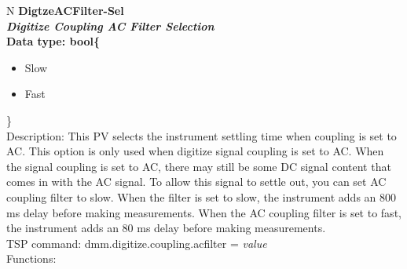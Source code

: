 \documentclass[openany]{article}
\begin{document}
		\begin{tabular}{N}
			\hline
			\bfseries DigtzeACFilter-Sel\label{pv:digtzeacfilter-sel} \\ \hline
			\emph{Digitize Coupling AC Filter Selection} \\
			Data type: bool\{\begin{itemize}[noitemsep]
				\small
				\item[] Slow
				\item[] Fast
			\end{itemize}\} \\
			Description: This PV selects the instrument settling time when coupling is set to AC. This option is only used when digitize signal coupling is set to AC. When the signal coupling is set to AC, there may still be some DC signal content that comes in with the AC signal. To allow this signal to settle out, you can set AC coupling filter to slow. When the filter is set to slow, the instrument adds an 800 ms delay before making measurements. When the AC coupling filter is set to fast, the instrument adds an 80 ms delay before making measurements. \\
			TSP command: dmm.digitize.coupling.acfilter = \emph{value} \\
			Functions: \\
			\arrayrulecolor{\FuncTableBorderColor}

		\end{tabular}
\end{document}
